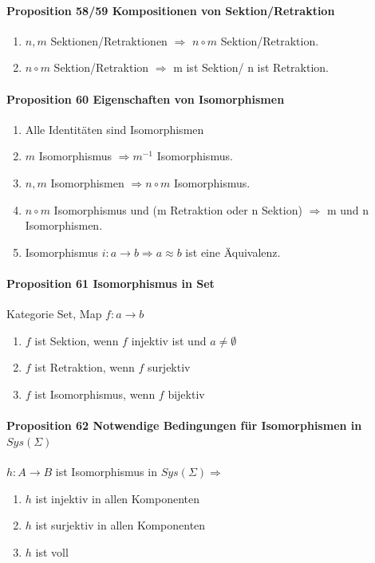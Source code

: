 \paragraph{Proposition 58/59 Kompositionen von Sektion/Retraktion}
\begin{enumerate}
\item $n, m$ Sektionen/Retraktionen $\Rightarrow$ $n \circ m$ Sektion/Retraktion.
\item $n \circ m$ Sektion/Retraktion $\Rightarrow$ m ist Sektion/ n ist Retraktion.
\end{enumerate}

\paragraph{Proposition 60 Eigenschaften von Isomorphismen}
\begin{enumerate}
\item Alle Identitäten sind Isomorphismen
\item $m$ Isomorphismus $\Rightarrow m^{-1}$ Isomorphismus.
\item $n, m$ Isomorphismen $\Rightarrow n \circ m$ Isomorphismus.
\item $n \circ m$ Isomorphismus und (m Retraktion oder n Sektion) $\Rightarrow $ m und n Isomorphismen.
\item Isomorphismus $i: a \rightarrow b \Rightarrow a \approx b$ ist eine Äquivalenz.
\end{enumerate}

\paragraph{Proposition 61 Isomorphismus in Set}
Kategorie Set, Map $f: a \rightarrow b$
\begin{enumerate}
\item $f$ ist Sektion, wenn $f$ injektiv ist und $a \neq \emptyset$
\item $f$ ist Retraktion, wenn $f$ surjektiv 
\item $f$ ist Isomorphismus, wenn $f$ bijektiv
\end{enumerate}

\paragraph{Proposition 62 Notwendige Bedingungen für Isomorphismen in $Sys(\Sigma)$}
$h: A \rightarrow B$ ist Isomorphismus in $Sys(\Sigma) \Rightarrow$
\begin{enumerate}
\item $h$ ist injektiv in allen Komponenten
\item $h$ ist surjektiv in allen Komponenten
\item $h$ ist voll
\end{enumerate}
 
